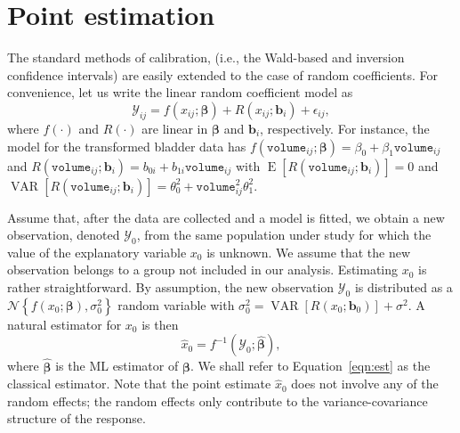 \documentclass{article}\usepackage[]{graphicx}\usepackage[]{color}
\newcommand{\VAR}{\operatorname{VAR}}
\newcommand{\E}{\operatorname{E}}
\begin{document}

\section{Point estimation}\label{sec:point}

The standard methods of calibration, (i.e., the Wald-based and inversion confidence intervals) are easily extended to the case of random coefficients.  For convenience, let us write the linear random coefficient model as
\begin{equation*}
  \mathcal{Y}_{ij} = f\left(x_{ij}; \bm{\beta}\right) + R\left(x_{ij}; \bm{b}_i\right) + \epsilon_{ij},
\end{equation*}
where $f(\cdot)$ and $R(\cdot)$ are linear in $\bm{\beta}$ and $\bm{b}_i$, respectively.  For instance, the model for the transformed bladder data has $f\left(\texttt{volume}_{ij}; \bm{\beta}\right) = \beta_0 + \beta_1 \texttt{volume}_{ij}$ and $R\left(\texttt{volume}_{ij}; \bm{b}_i\right) = b_{0i} + b_{1i}\texttt{volume}_{ij}$ with $\E\left[R\left(\texttt{volume}_{ij}; \bm{b}_i\right)\right] = 0$ and $\VAR\left[R\left(\texttt{volume}_{ij}; \bm{b}_i\right)\right] = \theta_0^2 + \texttt{volume}_{ij}^2\theta_1^2$.

Assume that, after the data are collected and a model is fitted, we obtain a new observation, denoted $\mathcal{Y}_0$, from the same population under study for which the value of the explanatory variable $x_0$ is unknown.  We assume that the new observation belongs to a group not included in our analysis.  Estimating $x_0$ is rather straightforward.  By assumption, the new observation $\mathcal{Y}_0$ is distributed as a $\mathcal{N}\left\{f\left(x_0; \bm{\beta}\right), \sigma_0^2\right\}$ random variable with $\sigma_0^2 = \VAR\left[ R\left( x_0; \bm{b}_0 \right) \right ] + \sigma^2$.  A natural estimator for $x_0$ is then
\begin{equation}
\label{eqn:est}
  \widehat{x}_0 = f^{-1}\left(\mathcal{Y}_0; \widehat{\bm{\beta}}\right),
\end{equation}
where $\widehat{\bm{\beta}}$ is the ML estimator of $\bm{\beta}$.  We shall refer to Equation~\eqref{eqn:est} as the classical estimator.  Note that the point estimate $\widehat{x}_0$ does not involve any of the random effects; the random effects only contribute to the variance-covariance structure of the response.
\end{document}

